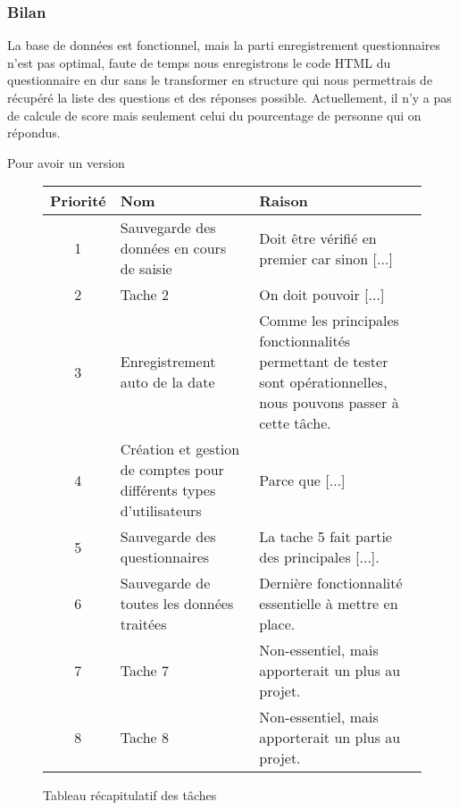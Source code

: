 \subsubsection{Bilan}

La base de données est fonctionnel, mais la parti enregistrement questionnaires n'est pas optimal, faute de temps nous enregistrons le code HTML du questionnaire en dur sans le transformer en structure qui nous permettrais de récupéré la liste des questions et des réponses possible. Actuellement, il n'y a pas de calcule de score mais seulement celui du pourcentage de personne qui on répondus.

Pour avoir un version 

\begin{figure}[H]
    \begin{center}
        \begin{tabularx}{17cm}{|c|p{6cm}|X|}
            \hline
            Priorité & Nom & Raison\\
            \hline
            1 & Sauvegarde des données en cours
            de saisie & Doit être vérifié en premier car sinon [...] \tabularnewline
            2 & Tache 2 & On doit pouvoir [...] \tabularnewline
            3 & Enregistrement auto de la date & Comme les principales fonctionnalités permettant de tester sont opérationnelles, nous pouvons passer à cette tâche. \tabularnewline
            4 & Création et gestion de comptes
            pour différents types d’utilisateurs & Parce que [...] \tabularnewline
            5 & Sauvegarde des questionnaires & La tache 5 fait partie des principales [...]. \tabularnewline
            6 & Sauvegarde de toutes les données
            traitées & Dernière fonctionnalité essentielle à mettre en place. \tabularnewline
            7 & Tache 7 & Non-essentiel, mais apporterait un plus au projet. \tabularnewline
            8 & Tache 8 & Non-essentiel, mais apporterait un plus au projet. \tabularnewline
            \hline
        \end{tabularx}
    \end{center}
    \caption{Tableau récapitulatif des tâches}
\end{figure}
